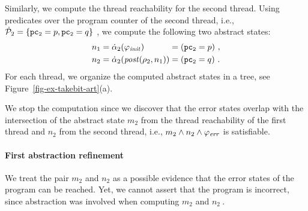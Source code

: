 

Similarly, we compute the thread reachability for the second thread.
Using predicates over the program counter of the second thread, i.e.,
$\artPreds_2 = \set{\pctwo=p, \pctwo=q}\ $, we compute the following
two abstract states:
%
\begin{equation*}
  \begin{array}[t]{l@{\;=\;}l@{\;=\;}l}
    n_1 &  \abst_2(\SymbInit) &  (\pctwo = p)\ ,\\[\jot]
    n_2 &  \abst_2(\post(\rel_2, n_1)) &  (\pctwo = q)\ .
  \end{array}
\end{equation*}
%
For each thread, we organize the computed abstract states in a tree,
see Figure~\ref{fig-ex-takebit-art}(a). 

We stop the \aret computation since we discover that the error states
overlap with the intersection of the abstract state $m_2$ from the
thread reachability of the first thread and $n_2$ from the second
thread, i.e., $m_2 \land n_2 \land \varphi_{\mathit{err}}$ is satisfiable.


\paragraph{First abstraction refinement} 

We treat the pair $m_2$ and $n_2$ as a possible evidence that the
error states of the program can be reached.
Yet, we cannot assert that the program is incorrect, since abstraction
was involved when computing $m_2$ and $n_2\ $.


